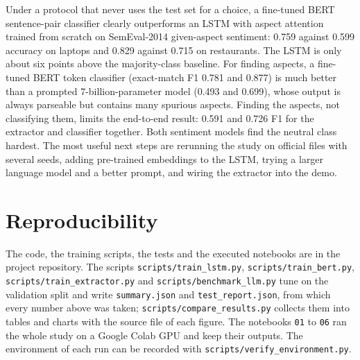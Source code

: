 \documentclass{nle}
\begin{document}
Under a protocol that never uses the test set for a choice, a fine-tuned BERT sentence-pair classifier clearly outperforms an LSTM with aspect attention trained from scratch on SemEval-2014 given-aspect sentiment: 0.759 against 0.599 accuracy on laptops and 0.829 against 0.715 on restaurants. The LSTM is only about six points above the majority-class baseline. For finding aspects, a fine-tuned BERT token classifier (exact-match F1 0.781 and 0.877) is much better than a prompted 7-billion-parameter model (0.493 and 0.699), whose output is always parseable but contains many spurious aspects. Finding the aspects, not classifying them, limits the end-to-end result: 0.591 and 0.726 F1 for the extractor and classifier together. Both sentiment models find the neutral class hardest. The most useful next steps are rerunning the study on official files with several seeds, adding pre-trained embeddings to the LSTM, trying a larger language model and a better prompt, and wiring the extractor into the demo.

\section*{Reproducibility}

The code, the training scripts, the tests and the executed notebooks are in the project repository. The scripts \texttt{scripts/train\_lstm.py}, \texttt{scripts/train\_bert.py}, \texttt{scripts/train\_extractor.py} and \texttt{scripts/benchmark\_llm.py} tune on the validation split and write \texttt{summary.json} and \texttt{test\_report.json}, from which every number above was taken; \texttt{scripts/compare\_results.py} collects them into tables and charts with the source file of each figure. The notebooks \texttt{01} to \texttt{06} ran the whole study on a Google Colab GPU and keep their outputs. The environment of each run can be recorded with \texttt{scripts/verify\_environment.py}.
\end{document}

